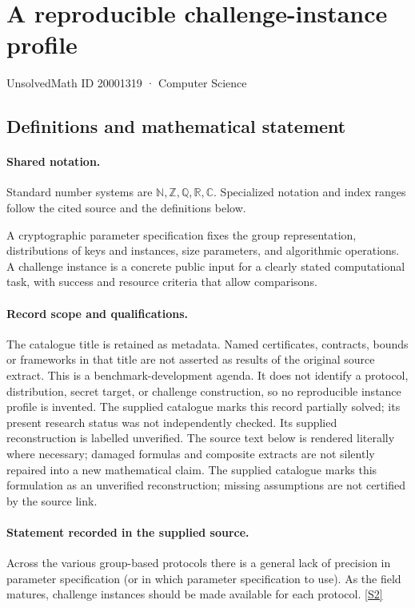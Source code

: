 \documentclass[11pt]{article}
\newcommand{\sref}[2]{\hyperlink{source:#1:#2}{[S#2]}}
\begin{document}
\setcounter{section}{20001318}
\section{A reproducible challenge-instance profile}\label{20001319}
{\small\sffamily UnsolvedMath ID 20001319 · Computer Science}
\subsection{Definitions and mathematical statement}

\paragraph{Shared notation.}Standard number systems are $\mathbb N,\mathbb Z,\mathbb Q,\mathbb R,\mathbb C$. Specialized notation and index ranges follow the cited source and the definitions below.


A cryptographic parameter specification fixes the group representation, distributions of keys and instances, size parameters, and algorithmic operations. A challenge instance is a concrete public input for a clearly stated computational task, with success and resource criteria that allow comparisons.
\paragraph{Record scope and qualifications.}
The catalogue title is retained as metadata. Named certificates, contracts, bounds or frameworks in that title are not asserted as results of the original source extract.
This is a benchmark-development agenda. It does not identify a protocol, distribution, secret target, or challenge construction, so no reproducible instance profile is invented. The supplied catalogue marks this record partially solved; its present research status was not independently checked. Its supplied reconstruction is labelled unverified.
The source text below is rendered literally where necessary; damaged formulas and composite extracts are not silently repaired into a new mathematical claim.
The supplied catalogue marks this formulation as an unverified reconstruction; missing assumptions are not certified by the source link.
\paragraph{Statement recorded in the supplied source.}
Across the various group-based protocols there is a general lack of precision in parameter specification (or in which parameter specification to use). As the field matures, challenge instances should be made available for each protocol. \sref{20001319}{2}
\end{document}
